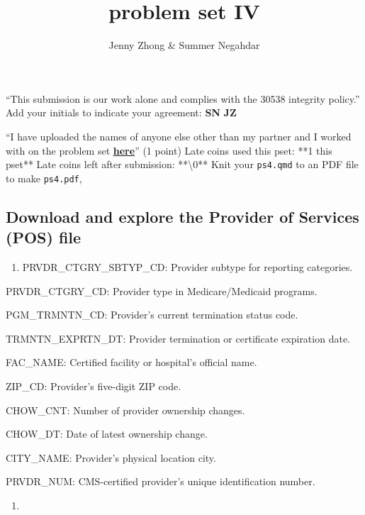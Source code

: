 \documentclass[
  letterpaper,
  DIV=11,
  numbers=noendperiod]{scrartcl}
\title{problem set IV}
\author{Jenny Zhong \& Summer Negahdar}
\date{}
\providecommand{\tightlist}{%
  \setlength{\itemsep}{0pt}\setlength{\parskip}{0pt}}\usepackage{longtable,booktabs,array}
\begin{document}
\maketitle



``This submission is our work alone and complies with the 30538
integrity policy.'' Add your initials to indicate your agreement:
\textbf{SN} \textbf{JZ}

``I have uploaded the names of anyone else other than my partner and I
worked with on the problem set
\textbf{\href{https://docs.google.com/forms/d/185usrCREQaUbvAXpWhChkjghdGgmAZXA3lPWpXLLsts/edit}{here}}''
(1 point) Late coins used this pset: **1 this pset** Late coins left
after submission: **\textbackslash0** Knit your \texttt{ps4.qmd} to an
PDF file to make \texttt{ps4.pdf},

\subsection{Download and explore the Provider of Services (POS)
file}\label{download-and-explore-the-provider-of-services-pos-file}

\begin{enumerate}
\def\labelenumi{\arabic{enumi}.}
\tightlist
\item
  PRVDR\_CTGRY\_SBTYP\_CD: Provider subtype for reporting categories.
\end{enumerate}

PRVDR\_CTGRY\_CD: Provider type in Medicare/Medicaid programs.

PGM\_TRMNTN\_CD: Provider's current termination status code.

TRMNTN\_EXPRTN\_DT: Provider termination or certificate expiration date.

FAC\_NAME: Certified facility or hospital's official name.

ZIP\_CD: Provider's five-digit ZIP code.

CHOW\_CNT: Number of provider ownership changes.

CHOW\_DT: Date of latest ownership change.

CITY\_NAME: Provider's physical location city.

PRVDR\_NUM: CMS-certified provider's unique identification number.

\begin{enumerate}
\def\labelenumi{\arabic{enumi}.}
\setcounter{enumi}{1}
\tightlist
\item
\end{enumerate}
\end{document}
